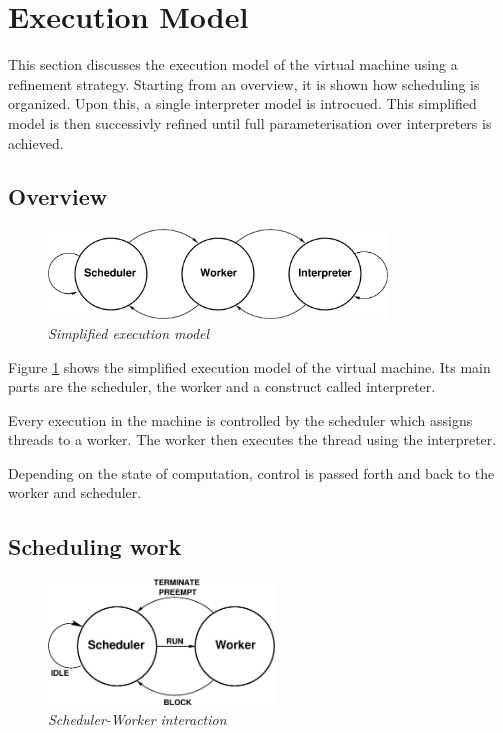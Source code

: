 \section{Execution Model}
This section discusses the execution model of the virtual machine using
a refinement strategy. Starting from an overview, it is shown how scheduling
is organized. Upon this, a single interpreter model is introcued.
This simplified model
is then successivly refined until full parameterisation over
interpreters is achieved.
\subsection{Overview}
\begin{figure}[ht]
\centering
\includegraphics[width=9cm]{figures/exec_overview.eps}
\caption{\label{model_overview} {\it Simplified execution model}}
\end{figure}

Figure \ref{model_overview}
shows the simplified execution model of the virtual machine.
Its main parts are the scheduler,
the worker and a construct called interpreter.

Every execution in the machine is controlled by the scheduler which assigns
threads to a worker.
The worker then executes the thread using the interpreter.

Depending on the state of computation, control is passed
forth and back to the worker and scheduler.
\subsection{Scheduling work}
\begin{figure}[ht]
\centering
\includegraphics[width=6cm]{figures/exec_scheduler.eps}
\caption{\label{model_scheduler} {\it Scheduler-Worker interaction}}
\end{figure}

